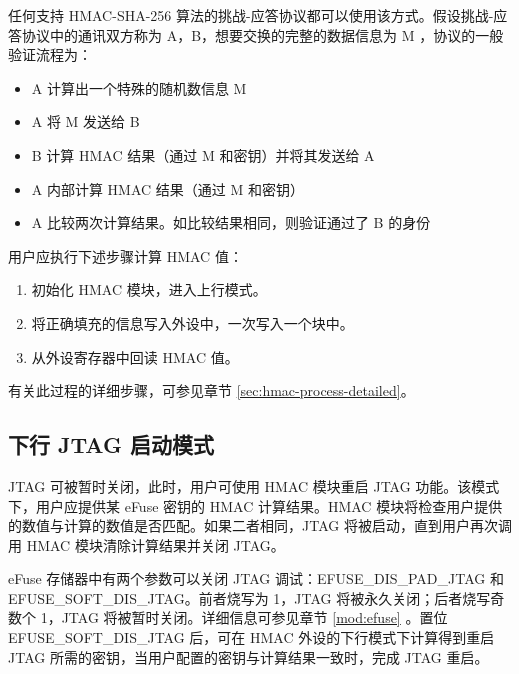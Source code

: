 \documentclass[main\_\_CN.tex]{subfiles}
\begin{document}
任何支持 HMAC-SHA-256 算法的挑战-应答协议都可以使用该方式。假设挑战-应答协议中的通讯双方称为 A，B，想要交换的完整的数据信息为 M ，协议的一般验证流程为：

\begin{itemize}
    \item A 计算出一个特殊的随机数信息 M
    \item A 将 M 发送给 B
    \item B 计算 HMAC 结果（通过 M 和密钥）并将其发送给 A
    \item A 内部计算 HMAC 结果（通过 M 和密钥）
    \item A 比较两次计算结果。如比较结果相同，则验证通过了 B 的身份
\end{itemize}

用户应执行下述步骤计算 HMAC 值：

\begin{enumerate}
    \item 初始化 HMAC 模块，进入上行模式。
    \item 将正确填充的信息写入外设中，一次写入一个块中。
    \item 从外设寄存器中回读 HMAC 值。
\end{enumerate}

有关此过程的详细步骤，可参见章节 \ref{sec:hmac-process-detailed}。

\subsection{下行 JTAG 启动模式}

JTAG 可被暂时关闭，此时，用户可使用 HMAC 模块重启 JTAG 功能。该模式下，用户应提供某 eFuse 密钥的 HMAC 计算结果。HMAC 模块将检查用户提供的数值与计算的数值是否匹配。如果二者相同，JTAG 将被启动，直到用户再次调用 HMAC 模块清除计算结果并关闭 JTAG。

eFuse 存储器中有两个参数可以关闭 JTAG 调试：EFUSE\_DIS\_PAD\_JTAG 和 EFUSE\_SOFT\_DIS\_JTAG。前者烧写为 1，JTAG 将被永久关闭；后者烧写奇数个 1，JTAG 将被暂时关闭。详细信息可参见章节 \ref{mod:efuse} \textit{}。置位 EFUSE\_SOFT\_DIS\_JTAG 后，可在 HMAC 外设的下行模式下计算得到重启 JTAG 所需的密钥，当用户配置的密钥与计算结果一致时，完成 JTAG 重启。
\end{document}

